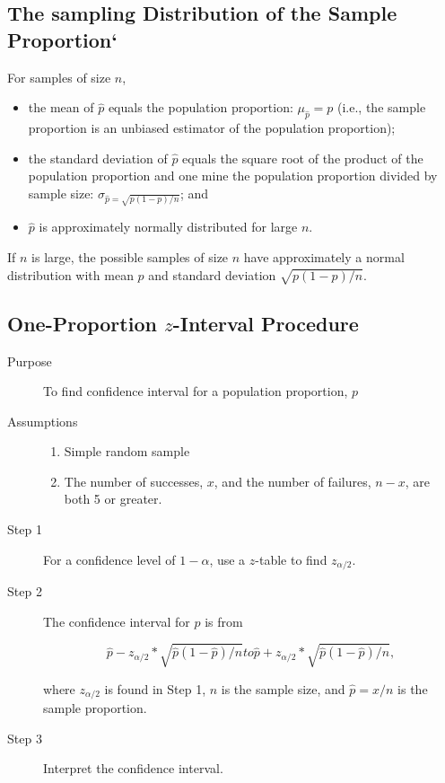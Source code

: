 \documentclass[12pt]{article}
\begin{document}
        \subsection*{The sampling Distribution of the Sample Proportion`}
            For samples of size $n$,
            \begin{itemize}
                \item the mean of $\hat{p}$ equals the population proportion: $\mu_{\hat{p}}
                = p$ (i.e., the sample proportion is an unbiased estimator of the population
                proportion);
                \item the standard deviation of $\hat{p}$ equals the square root of the
                product of the population proportion and one mine the population proportion
                divided by sample size: $\sigma_{\hat{p} = \sqrt{p(1-p)/n}}$; and
                \item $\hat{p}$ is approximately normally distributed for large $n$.
            \end{itemize}
            If $n$ is large, the possible samples of size $n$ have approximately a normal
            distribution with mean $p$ and standard deviation $\sqrt{p(1-p)/n}$.
        \subsection{One-Proportion $z$-Interval Procedure}
            \begin{description}
                \item[Purpose] To find confidence interval for a population proportion, $p$
                \item[Assumptions] 
                \begin{enumerate}
                    \item Simple random sample
                    \item The number of successes, $x$, and the number of failures, $n-x$,
                    are both 5 or greater.                    
                \end{enumerate}
                \item[Step 1] For a confidence level of $1-\alpha$, use a $z$-table to find
                $z_{\alpha/2}$.
                \item[Step 2] The confidence interval for $p$ is from 
                \begin{center}
                    \[
                        \hat{p}-z_{\alpha/2}*\sqrt{\hat{p}(1-\hat{p})/n} to
                        \hat{p}+z_{\alpha/2}*\sqrt{\hat{p}(1-\hat{p})/n},
                    \]
                \end{center}
                where $z_{\alpha/2}$ is found in Step 1, $n$ is the sample size, and 
                $\hat{p}=x/n$ is the sample proportion. 
                \item[Step 3] Interpret the confidence interval.
            \end{description}
\end{document}
